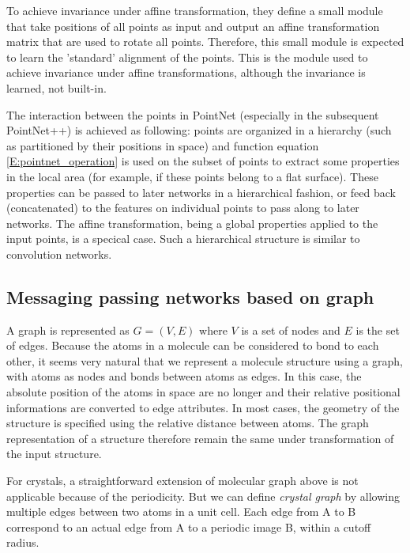 \documentclass{IEEEtran}
\begin{document}
To achieve invariance under affine transformation, they define a small module that take positions 
of all points as input and output an affine transformation matrix that are used to rotate all points. 
Therefore, this small module is expected to learn the 'standard' alignment of the points. This is 
the module used to achieve invariance under affine transformations, although the invariance is learned, 
not built-in. 

The interaction between the points in PointNet (especially in the subsequent PointNet++\cite{qi_pointnet_2017-1}) 
is achieved as following: points are organized in a hierarchy 
(such as partitioned by their positions in space) and function equation \eqref{E:pointnet_operation}
is used on the subset of points to extract some properties in the local area (for example, if these 
points belong to a flat surface). These properties can be passed to later networks in a hierarchical
fashion, or feed back (concatenated) to the features on individual points to pass along to later 
networks.
The affine transformation, being a global properties applied to the input points, is a specical case. 
Such a hierarchical structure is similar to convolution networks.

\subsection*{Messaging passing networks based on graph}

A graph is represented as $G = (V,E)$ where $V$ is a set of nodes and $E$ is the set of edges\cite{wu_2021}.
Because the atoms in a molecule can be considered to bond to each other, it seems very natural that we 
represent a molecule structure using a graph, with atoms as nodes and bonds between atoms as edges. 
In this case, the absolute position of the atoms in space are no longer and their relative positional 
informations are converted to edge attributes. 
In most cases, the geometry of the structure is specified using the relative distance between atoms. 
The graph representation of a structure therefore remain the same under transformation of the input 
structure.

For crystals, a straightforward extension of molecular graph above is not applicable because of the periodicity. 
But we can define \emph{crystal graph} by allowing multiple edges between two atoms in a unit cell. 
Each edge from A to B correspond to an actual edge from A to a periodic image B, within a cutoff 
radius. 
\end{document}
